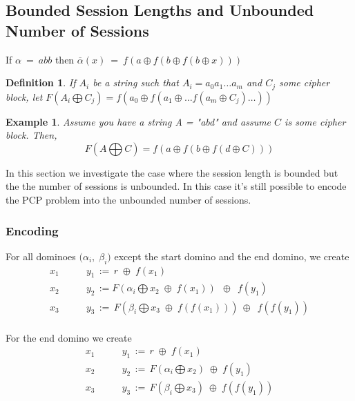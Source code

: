\documentclass{easychair}
\newtheorem{definition}{Definition}
\newtheorem{example}{Example}
\begin{document}
\subsection{Bounded Session Lengths and Unbounded Number of Sessions}

If $\alpha ~ = ~ abb$ then $\overline{\alpha} (x) ~ = ~ f(a \oplus f(b \oplus f(b \oplus x)))$\\[+10pt]
\begin{definition}
	If $A_i$ be a string such that $A_i = a_0 a_1\ldots a_m$ and 
	$C_j$ some cipher block, let $F(A_i \bigoplus C_j) =
	f(a_0 \oplus f(a_1 \oplus \ldots f(a_m \oplus C_j) \ldots ))$
\end{definition}

\begin{example}
	Assume you have a string A = "abd" and assume $C$ is some cipher
	block. Then, 
	\[F(A \bigoplus C) = 
	f(a \oplus f(b \oplus f(d \oplus C)))
	\]
\end{example}

In this section we investigate the case where the session length
is bounded but the the number of sessions is unbounded. In this
case it's still possible to encode the PCP problem into the 
unbounded number of sessions. 

\subsubsection{Encoding}
For all dominoes $\big( \alpha_i , \; \beta_i \big)$ except the start domino and the end domino, we create
\[
\begin{array}{cl}
x_1 & \qquad y_1 \, := \, r \; \oplus \; f( x_1 ) \\[+10pt]
x_2 & \qquad y_2 \, := F(\alpha_i \bigoplus  x_2 \; \oplus \;   f(x_1))\; ~ \oplus ~ \; f( y_1 ) \\[+10pt]
x_3 & \qquad y_3 \, := \,  F(\beta_i \bigoplus  x_3 \; \oplus \; f(f(x_1))) ~ \oplus ~ \; f(f( y_1 )) \\[+10pt]
\end{array}
\]

For the end domino we create
\[
\begin{array}{cl}
x_1 & \qquad y_1 \, := \, r \; \oplus \; f( x_1 ) \\[+10pt]
x_2 & \qquad y_2 \, := \, F(\alpha_i \bigoplus x_2) \; \oplus \;   f( y_1 ) \\[+10pt]
x_3 & \qquad y_3 \, := \,  F(\beta_i \bigoplus x_3) \; \oplus \; f(f( y_1 )) \\[+10pt]
\end{array}
\]
\end{document}
